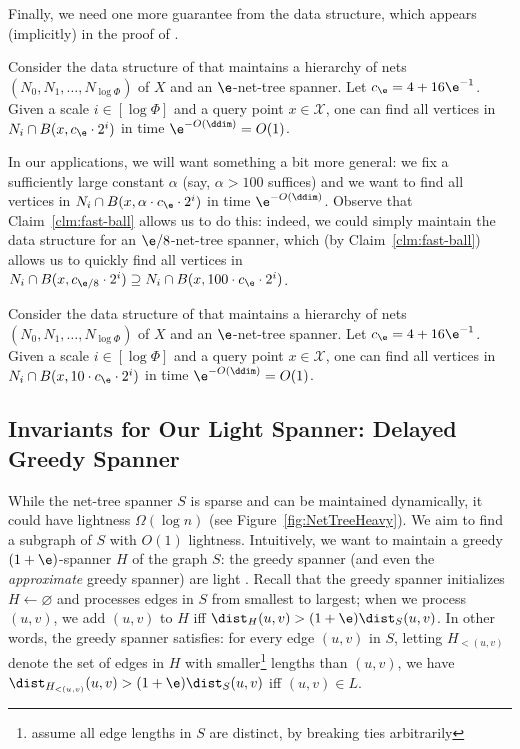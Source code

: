 %
Finally, we need one more guarantee from the \cite{gao2004deformable} data structure, which appears (implicitly) in the proof of \cite[Theorem 4.2]{gao2004deformable}.
\begin{claim}
\label{clm:fast-ball}
    Consider the data structure of \cite{gao2004deformable} that maintains a hierarchy of nets $(N_0, N_1, \ldots, N_{\log \Phi})$ of $X$  and an $\e$-net-tree spanner. Let $c_\e = 4 + 16\e^{-1}$.
    Given a scale $i \in [\log \Phi]$ and a query point $x \in \mathcal X$,  one can find all vertices in $N_i \cap B(x, c_\e \cdot 2^i)$ in time $\e^{-O(\ddim)} = O(1)$.
\end{claim}
In our applications, we will want something a bit more general: we fix a sufficiently large constant $\alpha$ (say, $\alpha > 100$ suffices) and we want to find all vertices in $N_i \cap B(x, \alpha \cdot c_\e \cdot 2^i)$ in time $\e^{-O(\ddim)}$. Observe that Claim~\ref{clm:fast-ball} allows us to do this: indeed, we could simply maintain the data structure for an $\e/8$-net-tree spanner, which (by Claim~\ref{clm:fast-ball}) allows us to quickly find all vertices in $N_i \cap B(x, c_{\e/8} \cdot 2^i) \supseteq N_i \cap B(x, 100 \cdot c_\e \cdot 2^i)$.
\begin{corollary}
\label{cor:expanded-fast-ball}
    Consider the data structure of \cite{gao2004deformable} that maintains a hierarchy of nets $(N_0, N_1, \ldots, N_{\log \Phi})$ of $X$  and an $\e$-net-tree spanner. Let $c_\e = 4 + 16\e^{-1}$.
    Given a scale $i \in [\log \Phi]$ and a query point $x \in \mathcal X$,  one can find all vertices in $N_i \cap B(x, 10 \cdot c_\e \cdot 2^i)$ in time $\e^{-O(\ddim)} = O(1)$.
%
\end{corollary}
%
%
%
\subsection{Invariants for Our Light Spanner: Delayed Greedy Spanner}
\label{SS:invariants}
%
While the net-tree spanner $S$ is sparse and can be maintained dynamically, it could have lightness $\Omega(\log n)$ (see Figure~\ref{fig:NetTreeHeavy}).
We aim to find a subgraph of $S$ with $O(1)$ lightness. 
Intuitively, we want to maintain a greedy $(1+\e)$-spanner $H$ of the graph $S$: the greedy spanner (and even the \emph{approximate} greedy spanner) are light \cite{BLW19,FS20}. Recall that the greedy spanner initializes $H \gets \varnothing$ and processes edges in $S$ from smallest to largest; when we process $(u,v)$, we add $(u,v)$ to $H$ iff $\dist_{H}(u,v) > (1+\e) \dist_S(u,v)$. In other words, the greedy spanner satisfies: for every edge $(u,v)$ in $S$, letting $H_{<(u,v)}$
denote the set of edges in $H$ with smaller\footnote{assume all edge lengths in $S$ are distinct, by breaking ties arbitrarily} lengths than $(u,v)$, we have 
$\dist_{H_{<(u,v)}}(u,v) > (1+\e) \dist_S(u,v)$ iff $(u,v) \in L$.
%
